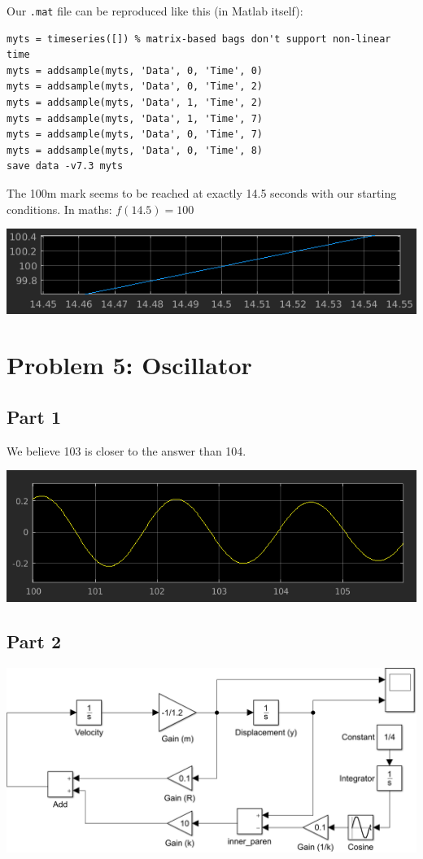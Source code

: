 \documentclass[a4paper,parskip,headheight=38pt]{scrartcl} %
\begin{document}
 \pagebreak{}
Our \texttt{.mat} file can be reproduced like this (in Matlab itself):
\vspace{-\baselineskip}\begin{verbatim}
myts = timeseries([]) % matrix-based bags don't support non-linear time
myts = addsample(myts, 'Data', 0, 'Time', 0)
myts = addsample(myts, 'Data', 0, 'Time', 2)
myts = addsample(myts, 'Data', 1, 'Time', 2)
myts = addsample(myts, 'Data', 1, 'Time', 7)
myts = addsample(myts, 'Data', 0, 'Time', 7)
myts = addsample(myts, 'Data', 0, 'Time', 8)
save data -v7.3 myts
\end{verbatim}

The 100m mark seems to be reached at exactly 14.5 seconds with our
starting conditions.  In maths: $f(14.5) = 100$

\includegraphics[width=\textwidth]{p4b-proof-small}


\section*{Problem 5: Oscillator}

\subsection*{Part 1}

We believe 103 is closer to the answer than 104.

\includegraphics[width=\textwidth]{p5a-proof-small}

\subsection*{Part 2}

\includegraphics[width=\textwidth]{p5b-model}
\end{document}
